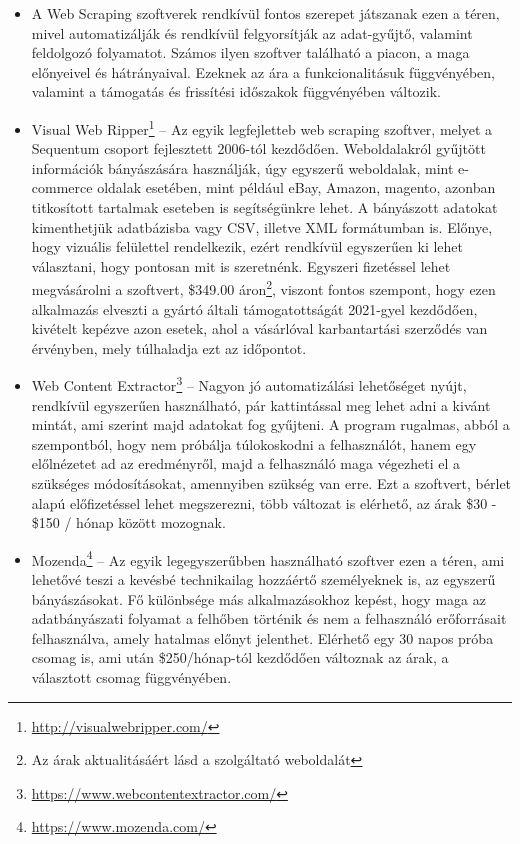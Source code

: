 \begin{itemize}
\item A Web Scraping szoftverek rendkívül fontos szerepet játszanak ezen a téren, mivel automatizálják és rendkívül felgyorsítják az adat-gyűjtő, valamint feldolgozó folyamatot. Számos ilyen szoftver található a piacon, a maga előnyeivel és hátrányaival. Ezeknek az ára a funkcionalitásuk függvényében, valamint a támogatás és frissítési időszakok függvényében változik. 
\item Visual Web Ripper\footnote{\url{http://visualwebripper.com/}} – Az egyik legfejletteb web scraping szoftver, melyet a Sequentum csoport fejlesztett 2006-tól kezdődően. Weboldalakról gyűjtött információk bányászására használják, úgy egyszerű weboldalak, mint e-commerce oldalak esetében, mint például eBay, Amazon, magento, azonban titkosított tartalmak eseteben is segítségünkre lehet. A bányászott adatokat kimenthetjük adatbázisba vagy CSV, illetve XML formátumban is. Előnye, hogy vizuális felülettel rendelkezik, ezért rendkívül egyszerűen ki lehet választani, hogy pontosan mit is szeretnénk. Egyszeri fizetéssel lehet megvásárolni a szoftvert, \$349.00 áron\footnote{\label{price_disclaimer}Az árak aktualitásáért lásd a szolgáltató weboldalát}, viszont fontos szempont, hogy ezen alkalmazás elveszti a gyártó általi támogatottságát 2021-gyel kezdődően, kivételt kepézve azon esetek, ahol a vásárlóval karbantartási szerződés van érvényben, mely túlhaladja ezt az időpontot.
\item Web Content Extractor\footnote{\url{https://www.webcontentextractor.com/}} – Nagyon jó automatizálási lehetőséget nyújt, rendkívül egyszerűen használható, pár kattintással meg lehet adni a kivánt mintát, ami szerint majd adatokat fog gyűjteni. A program rugalmas, abból a szempontból, hogy nem próbálja túlokoskodni a felhasználót, hanem egy előlnézetet ad az eredményről, majd a felhasználó maga végezheti el a szükséges módosításokat, amennyiben szükség van erre. Ezt a szoftvert, bérlet alapú előfizetéssel lehet megszerezni, több változat is elérhető, az árak \$30 - \$150 / hónap között mozognak.
\item Mozenda\footnote{\url{https://www.mozenda.com/}} – Az egyik legegyszerűbben használható szoftver ezen a téren, ami lehetővé teszi a kevésbé technikailag hozzáértő személyeknek is, az egyszerű bányászásokat. Fő különbsége más alkalmazásokhoz kepést, hogy maga az adatbányászati folyamat a felhőben történik és nem a felhasználó erőforrásait felhasználva, amely hatalmas előnyt jelenthet. Elérhető egy 30 napos próba csomag is, ami után \$250/hónap-tól kezdődően változnak az árak, a választott csomag függvényében.

\end{itemize}
